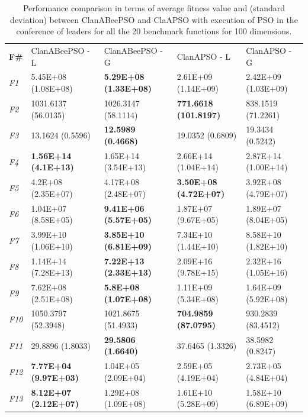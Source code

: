 \begin{table}[!h]
\caption{\small{Performance comparison in terms of average fitness value and (standard deviation) between ClanABeePSO and ClaAPSO with execution of PSO in the conference of leaders for all the 20 benchmark functions for 100 dimensions.}}
\label{tab:Comparison_ClanABeePSO_PSO}
\begin{center}
\begin{tabular}{p{0.5cm}|p{2.5cm}|p{2.5cm}|p{2.5cm}|p{2.5cm}}
\hline\noalign{\smallskip}
\textbf{F\#}	& ClanABeePSO - L & ClanABeePSO - G & ClanAPSO - L & ClanAPSO - G    \\		
\noalign{\smallskip}
\hline
\noalign{\smallskip}
\textit{F1}  & 5.45E+08 (1.08E+08)& \textbf{5.29E+08 (1.33E+08)} & 2.61E+09 (1.14E+09) & 2.42E+09 (1.03E+09)\\
\textit{F2}  & 1031.6137 (56.0135) & 1026.3147 (58.1114) & \textbf{771.6618 (101.8197)} & 838.1519 (71.2261)\\
\textit{F3}  & 13.1624 (0.5596) & \textbf{12.5989 (0.4668)} & 19.0352 (0.6809) & 19.3434 (0.5242)\\
\textit{F4}  & \textbf{1.56E+14 (4.1E+13)} & 1.65E+14 (3.54E+13) & 2.66E+14 (1.04E+14) & 2.87E+14 (1.00E+14)\\
\textit{F5}  & 4.2E+08 (2.35E+07) & 4.17E+08 (2.48E+07) & \textbf{3.50E+08 (4.72E+07)} & 3.92E+08 (4.79E+07)\\
\textit{F6}  & 1.04E+07 (8.58E+05) & \textbf{9.41E+06 (5.57E+05)} & 1.87E+07 (9.67E+05) & 1.89E+07 (8.04E+05)\\
\textit{F7}  & 3.99E+10 (1.06E+10) & \textbf{3.85E+10 (6.81E+09)} & 7.34E+10 (1.44E+10) & 8.58E+10 (1.82E+10)\\
\textit{F8}  & 1.14E+14 (7.28E+13) & \textbf{7.22E+13 (2.33E+13)} & 2.09E+16 (9.78E+15) & 2.32E+16 (1.05E+16)\\
\textit{F9}  & 7.62E+08 (2.51E+08) & \textbf{5.8E+08 (1.07E+08)} & 1.11E+09 (5.34E+08) & 1.64E+09 (5.92E+08)\\
\textit{F10} & 1050.3797 (52.3948) & 1021.8675 (51.4933) & \textbf{704.9859 (87.0795)} & 930.2839 (83.4512)\\
\textit{F11} & 29.8896 (1.8033) & \textbf{29.5806 (1.6640)} & 37.6465 (1.3326) & 38.5982 (0.8247)\\
\textit{F12} & \textbf{7.77E+04 (9.97E+03)} & 1.04E+05 (2.09E+04) & 2.59E+05 (4.19E+04) & 2.73E+05 (4.84E+04)\\
\textit{F13} & \textbf{8.12E+07 (2.12E+07)} & 1.29E+08 (1.09E+08) & 1.61E+10 (5.28E+09) & 1.58E+10 (6.89E+09)\\

\end{tabular}
\end{center}
\end{table}
